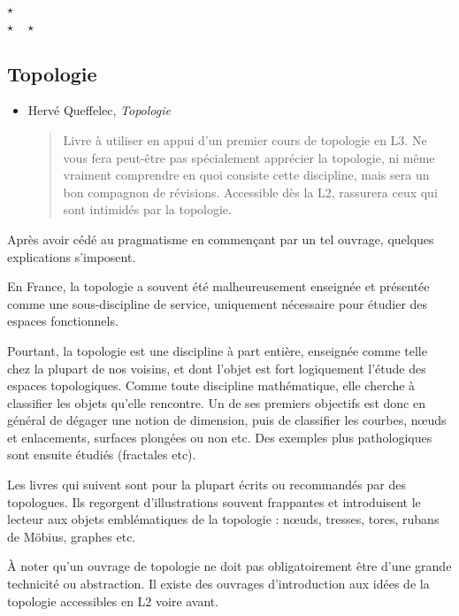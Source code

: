 \documentclass{article}
\def\separateur{\begin{center}
$\star$\\
$\star\quad\star$
\end{center}}
\begin{document}
\separateur
\subsection{Topologie}


\begin{mdframed}
\begin{itemize}
\item Hervé Queffelec, \emph{Topologie}
\begin{quote}
Livre à utiliser en appui d'un premier cours de topologie en L3. Ne vous fera peut-être pas spécialement apprécier la topologie, ni même vraiment comprendre en quoi consiste cette discipline, mais sera un bon compagnon de révisions. Accessible dès la L2, rassurera ceux qui sont intimidés par la topologie. 
\end{quote}
\end{itemize} 
\end{mdframed}

Après avoir cédé au pragmatisme en commençant par un tel ouvrage, quelques explications s'imposent.

En France, la topologie a souvent été malheureusement enseignée et présentée comme une sous-discipline de service, uniquement nécessaire pour étudier des espaces fonctionnels.

Pourtant, la topologie est une discipline à part entière, enseignée comme telle chez la plupart de nos voisins, et dont l'objet est fort logiquement l'étude des espaces topologiques. 
Comme toute discipline mathématique, elle cherche à classifier les objets qu'elle rencontre. Un de ses premiers objectifs est donc en général de dégager une notion de dimension, puis de classifier les courbes, n\oe uds et enlacements, surfaces plongées ou non etc. Des exemples plus pathologiques sont ensuite étudiés (fractales etc).

Les livres qui suivent sont pour la plupart écrits ou recommandés par des topologues. Ils regorgent d'illustrations souvent frappantes et introduisent le lecteur aux objets emblématiques de la topologie : n\oe uds, tresses, tores, rubans de Möbius, graphes etc.

À noter qu'un ouvrage de topologie ne doit pas obligatoirement être d'une grande technicité ou abstraction. Il existe des ouvrages d'introduction aux idées de la topologie accessibles en L2 voire avant.
\end{document}
